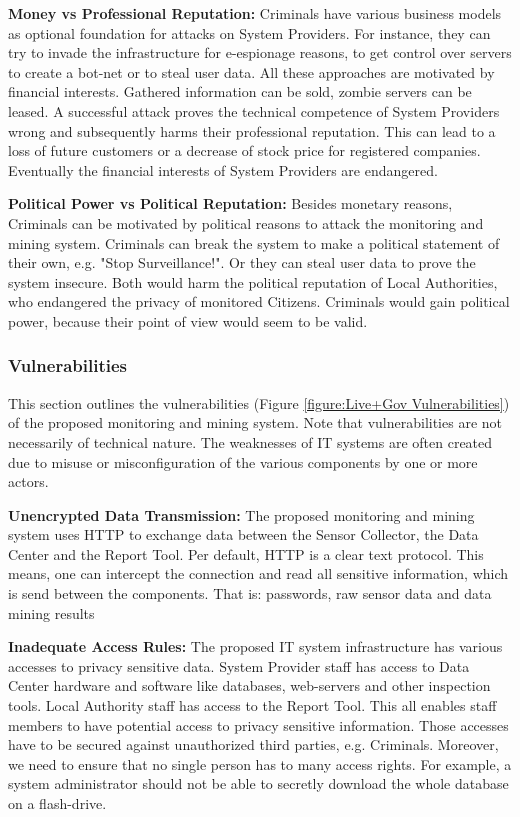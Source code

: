 \textbf{Money vs Professional Reputation:}
Criminals have various business models as optional foundation for attacks on System Providers.
For instance, they can try to invade the infrastructure for e-espionage reasons, to get control over servers to create a bot-net or to steal user data.
All these approaches are motivated by financial interests.
Gathered information can be sold, zombie servers can be leased.
A successful attack proves the technical competence of System Providers wrong and subsequently harms their professional reputation.
This can lead to a loss of future customers or a decrease of stock price for registered companies.
Eventually the financial interests of System Providers are endangered.


\textbf{Political Power vs Political Reputation:}
Besides monetary reasons, Criminals can be motivated by political reasons to attack the monitoring and mining system.
Criminals can break the system to make a political statement of their own, e.g. "Stop Surveillance!".
Or they can steal user data to prove the system insecure.
Both would harm the political reputation of Local Authorities, who endangered the privacy of monitored Citizens.
Criminals would gain political power, because their point of view would seem to be valid.




\subsubsection{Vulnerabilities}
This section outlines the vulnerabilities (Figure \ref{figure:Live+Gov Vulnerabilities}) of the proposed monitoring and mining system.
Note that vulnerabilities are not necessarily of technical nature.
The weaknesses of IT systems are often created due to misuse or misconfiguration of the various components by one or more actors.



\textbf{Unencrypted Data Transmission:}
The proposed monitoring and mining system uses HTTP to exchange data between the Sensor Collector, the Data Center and the Report Tool.
Per default, HTTP is a clear text protocol.
This means, one can intercept the connection and read all sensitive information, which is send between the components.
That is: passwords, raw sensor data and data mining results

\textbf{Inadequate Access Rules:}
The proposed IT system infrastructure has various accesses to privacy sensitive data.
System Provider staff has access to Data Center hardware and software like databases, web-servers and other inspection tools.
Local Authority staff has access to the Report Tool.
This all enables staff members to have potential access to privacy sensitive information.
Those accesses have to be secured against unauthorized third parties, e.g. Criminals.
Moreover, we need to ensure that no single person has to many access rights.
For example, a system administrator should not be able to secretly download the whole database on a flash-drive.

